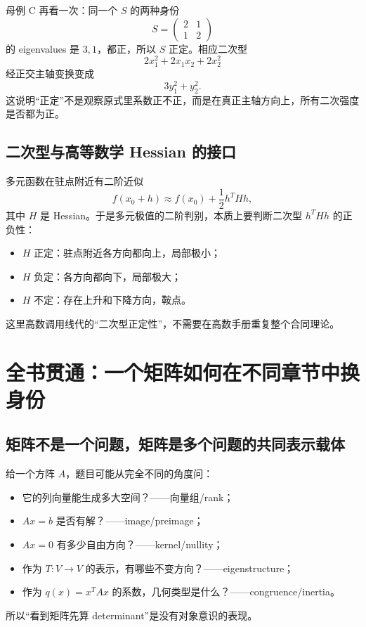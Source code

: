 \documentclass[11pt,a4paper,openany]{ctexbook}
\begin{document}
\begin{examplebox}{母例 C 再看一次：同一个 $S$ 的两种身份}
\[
S=\begin{pmatrix}2&1\\1&2\end{pmatrix}
\]
的 eigenvalues 是 $3,1$，都正，所以 $S$ 正定。相应二次型
\[
2x_1^2+2x_1x_2+2x_2^2
\]
经正交主轴变换变成
\[
3y_1^2+y_2^2.
\]
这说明“正定”不是观察原式里系数正不正，而是在真正主轴方向上，所有二次强度是否都为正。
\end{examplebox}

\section{二次型与高等数学 Hessian 的接口}
多元函数在驻点附近有二阶近似
\[
f(x_0+h)\approx f(x_0)+\frac12h^THh,
\]
其中 $H$ 是 Hessian。于是多元极值的二阶判别，本质上要判断二次型 $h^THh$ 的正负性：
\begin{itemize}
  \item $H$ 正定：驻点附近各方向都向上，局部极小；
  \item $H$ 负定：各方向都向下，局部极大；
  \item $H$ 不定：存在上升和下降方向，鞍点。
\end{itemize}
这里高数调用线代的“二次型正定性”，不需要在高数手册重复整个合同理论。

\chapter{全书贯通：一个矩阵如何在不同章节中换身份}

\section{矩阵不是一个问题，矩阵是多个问题的共同表示载体}
给一个方阵 $A$，题目可能从完全不同的角度问：
\begin{itemize}
  \item 它的列向量能生成多大空间？——向量组/rank；
  \item $Ax=b$ 是否有解？——image/preimage；
  \item $Ax=0$ 有多少自由方向？——kernel/nullity；
  \item 作为 $T:V\to V$ 的表示，有哪些不变方向？——eigenstructure；
  \item 作为 $q(x)=x^TAx$ 的系数，几何类型是什么？——congruence/inertia。
\end{itemize}
所以“看到矩阵先算 determinant”是没有对象意识的表现。
\end{document}
